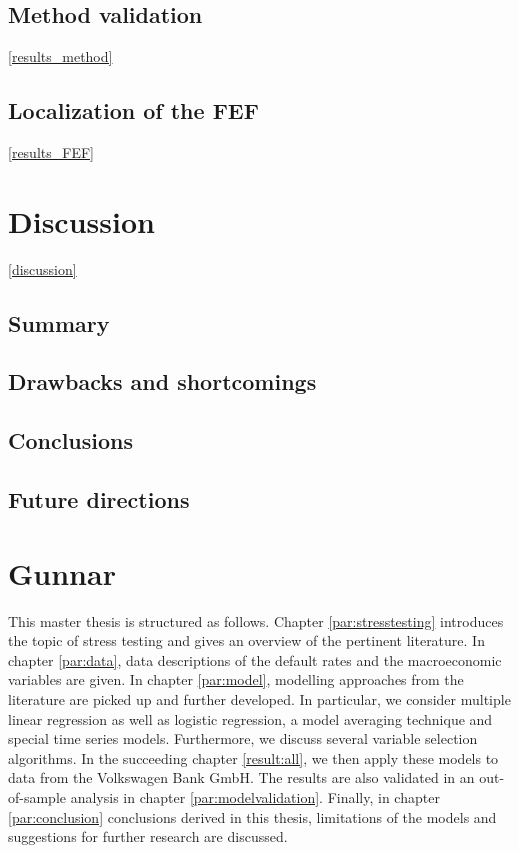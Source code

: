 \documentclass[a4paper, 12pt]{scrreprt}
\begin{document}
\bigskip

\section{Method validation}\ref{results_method}

\section{Localization of the FEF}\ref{results_FEF}

\chapter{Discussion}\ref{discussion}
\section{Summary}
\section{Drawbacks and shortcomings}
\section{Conclusions}
\section{Future directions}


\chapter{Gunnar}


This master thesis is structured as follows. Chapter \ref{par:stresstesting} introduces the topic of stress testing and gives an overview of the pertinent literature. In chapter \ref{par:data}, data descriptions of the default rates and the macroeconomic variables are given. In chapter \ref{par:model}, modelling approaches from the literature  are picked up and further developed. In particular, we consider multiple linear regression as well as logistic regression, a model averaging technique and special time series models. Furthermore, we discuss several variable selection algorithms.
In the succeeding chapter \ref{result:all}, we then apply these models to data from the Volkswagen Bank GmbH. 
The results are also validated in an out-of-sample analysis in chapter \ref{par:modelvalidation}. Finally, in chapter \ref{par:conclusion} conclusions derived in this thesis, limitations of the models and suggestions for further research are discussed. 
\end{document}
